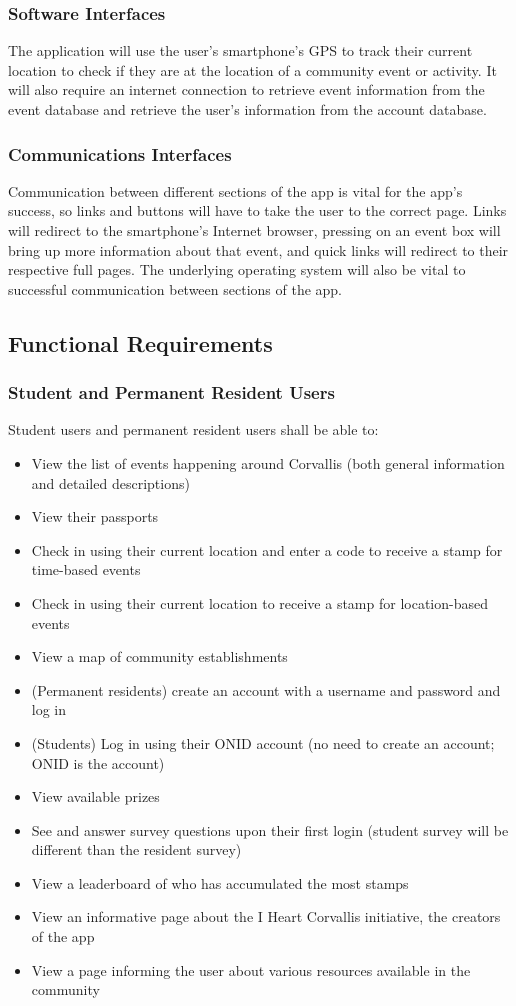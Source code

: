\documentclass[draftclsnofoot, onecolumn, 10pt, compsoc]{IEEEtran}
\begin{document}
			\subsubsection{Software Interfaces}
				The application will use the user's smartphone's GPS to track their current location to check if they are at the location of a community event or activity. It will also require an internet connection to retrieve event information from the event database and retrieve the user's information from the account database.

			\subsubsection{Communications Interfaces}
				Communication between different sections of the app is vital for the app's success, so links and buttons will have to take the user to the correct page. Links will redirect to the smartphone's Internet browser, pressing on an event box will bring up more information about that event, and quick links will redirect to their respective full pages. The underlying operating system will also be vital to successful communication between sections of the app.

		\subsection{Functional Requirements}
			\subsubsection{Student and Permanent Resident Users}
				Student users and permanent resident users shall be able to:
				\begin{itemize}
					\item View the list of events happening around Corvallis (both general information and detailed descriptions)
					\item View their passports
					\item Check in using their current location and enter a code to receive a stamp for time-based events
					\item Check in using their current location to receive a stamp for location-based events
					\item View a map of community establishments
					\item (Permanent residents) create an account with a username and password and log in
					\item (Students) Log in using their ONID account (no need to create an account; ONID is the account)
					\item View available prizes
					\item See and answer survey questions upon their first login (student survey will be different than the resident survey)
					\item View a leaderboard of who has accumulated the most stamps
					\item View an informative page about the I Heart Corvallis initiative, the creators of the app
					\item View a page informing the user about various resources available in the community
				\end{itemize}
\end{document}
